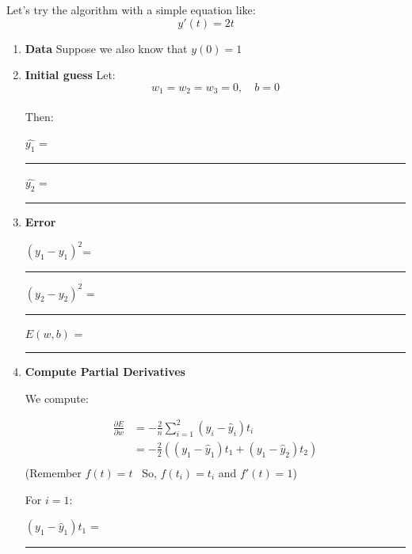 \documentclass[11pt]{article}
\begin{document}
Let's try the algorithm with a simple equation like:
\[
y'(t) = 2t
\]
\begin{enumerate}

\item  \textbf{Data}
Suppose we also know that $y(0) = 1$



\item \textbf{Initial guess}
Let:
\[
w_1 = w_2 = w_3 = 0, \quad b = 0
\]\\

Then:
\bigskip

$\hat{y_1}$ = \rule{5cm}{0.4pt}
\vspace{3cm}

$\hat{y_2}$ = \rule{5cm}{0.4pt}
\vspace{3cm}

\bigskip

\item \textbf{Error}

$(y_1 - \hat{y_1})^2$= \rule{5cm}{0.4pt}
\vspace{3cm}

$(y_2 - \hat{y_2})^2$ = \rule{5cm}{0.4pt}
\vspace{3cm}


$E(w,b)$ =  \rule{5cm}{0.4pt}
\vspace{3cm}



\item \textbf{Compute Partial Derivatives}

We compute:

\begin{align*}
\frac{\partial E}{\partial w} &= -\frac{2}{n} \sum_{i = 1}^2 (y_i - \hat{y}_i) t_i\\
&= -\frac{2}{2}\left((y_1 - \hat{y}_1) t_1 + (y_1 - \hat{y}_2) t_2\right)\\
\end{align*}
(Remember $f(t) = t$  \ So, $f(t_i) = t_i$ and $f'(t) = 1$)
\bigskip

For $i=1$:
\vspace{3cm}

$(y_1 - \hat{y}_1) t_1$ =  \rule{5cm}{0.4pt}
\vspace{3cm} 


\end{enumerate}
\end{document}
